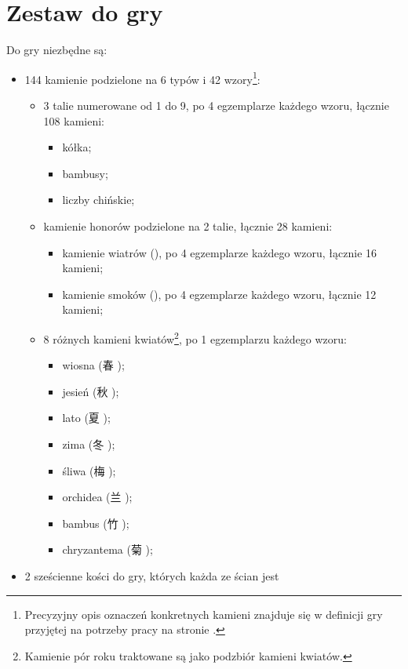\section{Zestaw do gry}
\label{guobiao_zestaw}
Do gry niezbędne są:
\begin{itemize}
  \item 144 kamienie podzielone na 6 typów i 42 wzory\footnote{Precyzyjny opis
  oznaczeń konkretnych kamieni znajduje się w definicji gry przyjętej na
  potrzeby pracy na stronie \pageref{definicja}.}:
  \begin{itemize}
    \item 3 talie numerowane od 1 do 9, po
    4 egzemplarze każdego wzoru, łącznie 108 kamieni:
    \begin{itemize}
      \item kółka;
      \item bambusy;
      \item liczby chińskie;
    \end{itemize}
    \item kamienie honorów podzielone na 2 talie, łącznie 28 kamieni:
    \begin{itemize}
      \item kamienie wiatrów (\wiatry), po 4 egzemplarze każdego wzoru, łącznie
      16 kamieni;
      \item kamienie smoków (\smoki), po 4 egzemplarze każdego wzoru, łącznie 12
      kamieni;
    \end{itemize}
    \item 8 różnych kamieni kwiatów\footnote{Kamienie pór roku traktowane są
    jako podzbiór kamieni kwiatów.}, po 1 egzemplarzu każdego wzoru:
    \begin{itemize}
      \item wiosna (春 );
      \item jesień (秋 );
      \item lato (夏 );
      \item zima (冬 );
      \item śliwa (梅 );
      \item orchidea (兰 );
      \item bambus (竹 );
      \item chryzantema (菊 );
    \end{itemize}
  \end{itemize}
  \item 2 sześcienne kości do gry, których każda ze ścian jest

\end{itemize}

